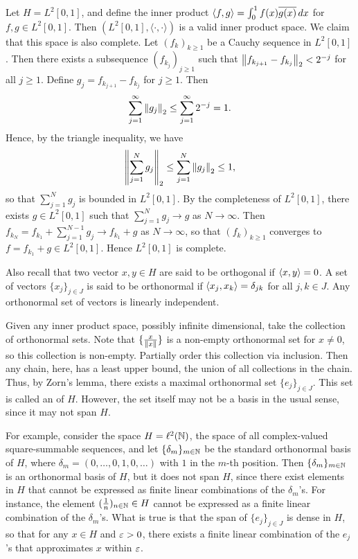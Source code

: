 \begin{example}
    Let $H = L^{2}[0,1]$, and define the inner product $\langle f,g\rangle = \int_{0}^{1} f(x)\overline{g(x)} \, dx$ for $f,g \in L^{2}[0,1]$. Then $(L^{2}[0,1],\langle \cdot, \cdot \rangle)$ is a valid inner product space. We claim that this space is also complete. Let $(f_{k})_{k \geq 1}$ be a Cauchy sequence in $L^{2}[0,1]$. Then there exists a subsequence $(f_{k_{j}})_{j \geq 1}$ such that $\left\lVert f_{k_{j+1}}-f_{k_{j}}\right\rVert_{2} < 2^{-j}$ for all $j \geq 1$. Define $g_{j} = f_{k_{j+1}}-f_{k_{j}}$ for $j \geq 1$. Then
    \begin{align}
        \sum_{j=1}^{\infty} \left\lVert g_{j}\right\rVert_{2} \leq \sum_{j=1}^{\infty} 2^{-j} = 1.
    \end{align}
    Hence, by the triangle inequality, we have
    \begin{align}
        \left\lVert\sum_{j=1}^{N} g_{j}\right\rVert_{2} \leq \sum_{j=1}^{N} \left\lVert g_{j}\right\rVert_{2} \leq 1,
    \end{align}
    so that $\sum_{j=1}^{N} g_{j}$ is bounded in $L^{2}[0,1]$. By the completeness of $L^{2}[0,1]$, there exists $g \in L^{2}[0,1]$ such that $\sum_{j=1}^{N} g_{j} \to g$ as $N \to \infty$. Then $f_{k_{N}} = f_{k_{1}} + \sum_{j=1}^{N-1} g_{j} \to f_{k_{1}} + g$ as $N \to \infty$, so that $(f_{k})_{k \geq 1}$ converges to $f = f_{k_{1}} + g \in L^{2}[0,1]$. Hence $L^{2}[0,1]$ is complete.
\end{example}

Also recall that two vector $x,y \in H$ are said to be orthogonal if $\langle x,y\rangle = 0$. A set of vectors $\{x_{j}\}_{j \in J}$ is said to be orthonormal if $\langle x_{j},x_{k}\rangle = \delta_{jk}$ for all $j,k \in J$. Any orthonormal set of vectors is linearly independent.

Given any inner product space, possibly infinite dimensional, take the collection of orthonormal sets. Note that $\{\frac{x}{\left\lVert x\right\rVert}\}$ is a non-empty orthonormal set for $x \neq 0$, so this collection is non-empty. Partially order this collection via inclusion. Then any chain, here, has a least upper bound, the union of all collections in the chain. Thus, by Zorn's lemma, there exists a maximal orthonormal set $\{e_{j}\}_{j \in J}$. This set is called an  of $H$. However, the set itself may not be a basis in the usual sense, since it may not span $H$. 

For example, consider the space $H = \ell^{2}(\mathbb{N})$, the space of all complex-valued square-summable sequences, and let $\{\delta_{m}\}_{m \in \mathbb{N}}$ be the standard orthonormal basis of $H$, where $\delta_{m} = (0,\ldots,0,1,0,\ldots)$ with $1$ in the $m$-th position. Then $\{\delta_{m}\}_{m \in \mathbb{N}}$ is an orthonormal basis of $H$, but it does not span $H$, since there exist elements in $H$ that cannot be expressed as finite linear combinations of the $\delta_{m}$'s. For instance, the element $(\frac{1}{n})_{n \in \mathbb{N}} \in H$ cannot be expressed as a finite linear combination of the $\delta_{m}$'s. What is true is that the span of $\{e_{j}\}_{j \in J}$ is dense in $H$, so that for any $x \in H$ and $\varepsilon > 0$, there exists a finite linear combination of the $e_{j}$'s that approximates $x$ within $\varepsilon$.


